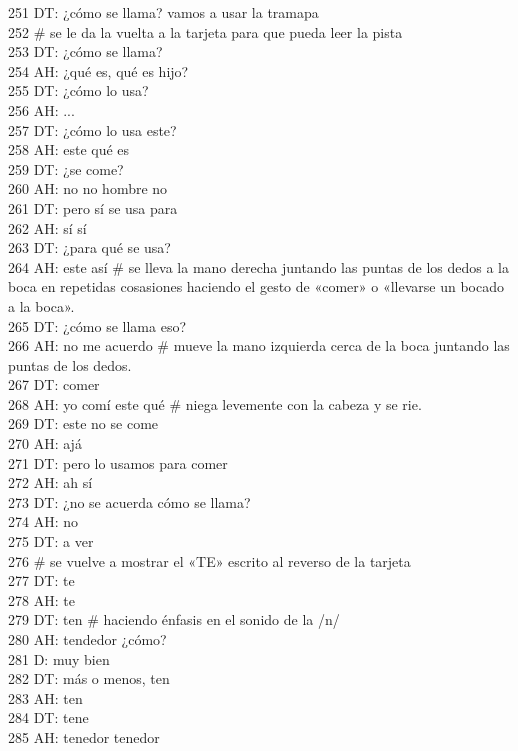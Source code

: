251 DT: ¿cómo se llama? vamos a usar la tramapa\\
252 \# se le da la vuelta a la tarjeta para que pueda leer la pista\\
253 DT: ¿cómo se llama?\\
254 AH: ¿qué es, qué es hijo?\\
255 DT: ¿cómo lo usa?\\
256 AH: ...\\
257 DT: ¿cómo lo usa este?\\
258 AH: este qué es\\
259 DT: ¿se come?\\
260 AH: no no hombre no\\
261 DT: pero sí se usa para\\
262 AH: sí sí\\
263 DT: ¿para qué se usa?\\
264 AH: este así \# se lleva la mano derecha juntando las puntas de los dedos a la boca en repetidas cosasiones haciendo el gesto de «comer» o «llevarse un bocado a la boca».\\
265 DT: ¿cómo se llama eso?\\
266 AH: no me acuerdo \# mueve la mano izquierda cerca de la boca juntando las puntas de los dedos.\\
267 DT: comer\\
268 AH: yo comí este qué \# niega levemente con la cabeza y se rie.\\
269 DT: este no se come\\
270 AH: ajá\\
271 DT: pero lo usamos para comer\\
272 AH: ah sí\\
273 DT: ¿no se acuerda cómo se llama?\\
274 AH: no\\
275 DT: a ver\\
276 \# se vuelve a mostrar el «TE» escrito al reverso de la tarjeta\\
277 DT: te\\
278 AH: te\\
279 DT: ten \# haciendo énfasis en el sonido de la /n/\\
280 AH: tendedor ¿cómo?\\
281 D: muy bien\\
282 DT: más o menos, ten\\
283 AH: ten\\
284 DT: tene\\
285 AH: tenedor tenedor\\
